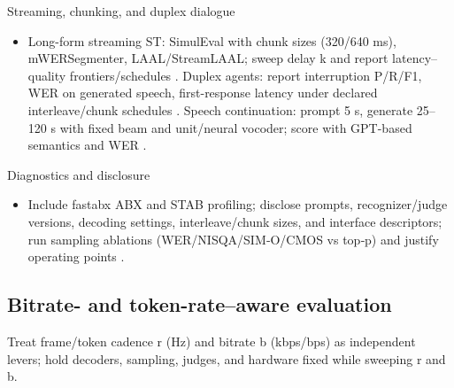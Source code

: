 \documentclass{article}
\begin{document}
Streaming, chunking, and duplex dialogue
\begin{itemize}
  \item Long-form streaming ST: SimulEval with chunk sizes (320/640 ms), mWERSegmenter, LAAL/StreamLAAL; sweep delay k and report latency–quality frontiers/schedules \cite{guo2025streamuniachievingstreamingspeechtransla,zhao2024textlessstreamingspeechtranslationsemant}. Duplex agents: report interruption P/R/F1, WER on generated speech, first-response latency under declared interleave/chunk schedules \cite{ma2024languagemodelcanlistenwhilespeaking,cui2025thinkbeforeyoutalkenhancingmeaningfuldia,hu2025salmduplexefficientdirectmodelingspeechl}. Speech continuation: prompt 5 s, generate 25–120 s with fixed beam and unit/neural vocoder; score with GPT-based semantics and WER \cite{nakata2024jchatjapaneselargescalespokendialoguecor,cui2025thinkbeforeyoutalkenhancingmeaningfuldia}.
\end{itemize}

Diagnostics and disclosure
\begin{itemize}
  \item Include fastabx ABX and STAB profiling; disclose prompts, recognizer/judge versions, decoding settings, interleave/chunk sizes, and interface descriptors; run sampling ablations (WER/NISQA/SIM‑O/CMOS vs top‑p) and justify operating points \cite{poli2025fastabxlibraryefficientcomputationabxdis,vashishth2024stabspeechtokenizerassessmentbenchmark,nguyen2025qwenvsgemmaintegrationwhispercomparative,li2024investigatingneuralaudiocodecsspeechlang}.
\end{itemize}

\subsection{Bitrate- and token-rate–aware evaluation} \label{subsec:Bitrate- and token-rate–aware evaluation}
Treat frame/token cadence r (Hz) and bitrate b (kbps/bps) as independent levers; hold decoders, sampling, judges, and hardware fixed while sweeping r and b.
\end{document}
